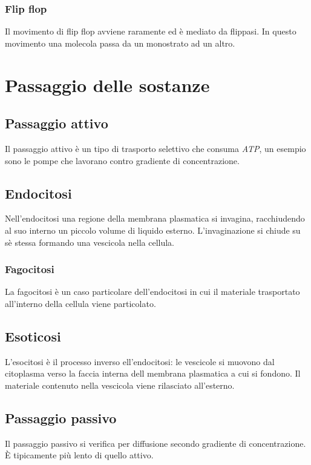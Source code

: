 		\subsubsection{Flip flop}
		Il movimento di flip flop avviene raramente ed \`e mediato da flippasi.
		In questo movimento una molecola passa da un monostrato ad un altro.


\section{Passaggio delle sostanze}

	\subsection{Passaggio attivo}
	Il passaggio attivo \`e un tipo di trasporto selettivo che consuma \emph{ATP}, un esempio sono le pompe che lavorano contro gradiente di concentrazione.

	\subsection{Endocitosi}
	Nell'endocitosi una regione della membrana plasmatica si invagina, racchiudendo al suo interno un piccolo volume di liquido esterno.
	L'invaginazione si chiude su s\`e stessa formando una vescicola nella cellula.

		\subsubsection{Fagocitosi}
		La fagocitosi \`e un caso particolare dell'endocitosi in cui il materiale trasportato all'interno della cellula viene particolato.

	\subsection{Esoticosi}
	L'esocitosi \`e il processo inverso ell'endocitosi: le vescicole si muovono dal citoplasma verso la faccia interna dell membrana plasmatica a cui si fondono.
	Il materiale contenuto nella vescicola viene rilasciato all'esterno.

	\subsection{Passaggio passivo}
	Il passaggio passivo si verifica per diffusione secondo gradiente di concentrazione.
	\`E tipicamente pi\`u lento di quello attivo.

